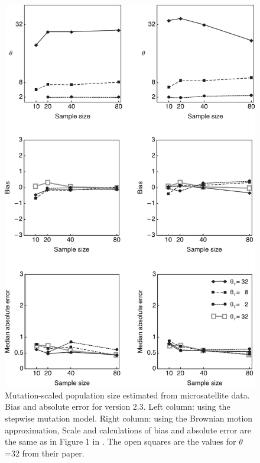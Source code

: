 \begin{figure}[hb]

\begin{center}
\includegraphics[width=12cm]{mim/biasfig_revised}

\end{center}
\caption{Mutation-scaled population size estimated from microsatellite data. Bias and absolute error for \migrate version 2.3. Left column: using the stepwise mutation model. Right column: using the Brownian motion approximation, Scale and calculations of bias and absolute error are the same as in Figure 1 in \cite{roychoudhury:2007:fae}. The open squares are the values for $\theta$=32 from their paper.
}
\label{fig:msatcomp}
\end{figure}
\clearpage
